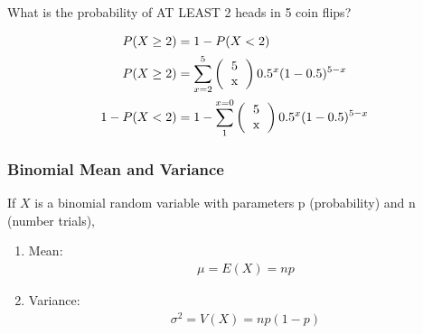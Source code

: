 \documentclass[../INDE315.tex]{subfiles}
\begin{document}
\begin{exmp}
    What is the probability of AT LEAST 2 heads in 5 coin flips?
\end{exmp}
\begin{equation*}
    \begin{aligned}
        P(X \geq 2) &= 1 - P(X < 2) \\
        P(X \geq 2) &= \sum ^5_{x = 2} \left( \begin{tabular}{c}
            5 \\
            x
            \end{tabular}  \right) 0.5^x (1 - 0.5)^{5-x} \\
        1 - P(X < 2) &= 1 - \sum_{1}^{x=0}\left( \begin{tabular}{c}
            5 \\
            x
            \end{tabular}  \right) 0.5^x (1 - 0.5)^{5-x} \\
    \end{aligned}
\end{equation*}

\subsubsection*{Binomial Mean and Variance}
If $X$ is a binomial random variable with parameters p (probability) and n (number trials), 
\begin{enumerate}
    \item Mean:
        \begin{equation*}
            \begin{aligned}
                \mu = E(X) = np
            \end{aligned}
        \end{equation*}
    \item Variance:
        \begin{equation*}
            \begin{aligned}
                \sigma ^2 = V(X) = np(1-p)
            \end{aligned}
        \end{equation*}
\end{enumerate}
\end{document}
